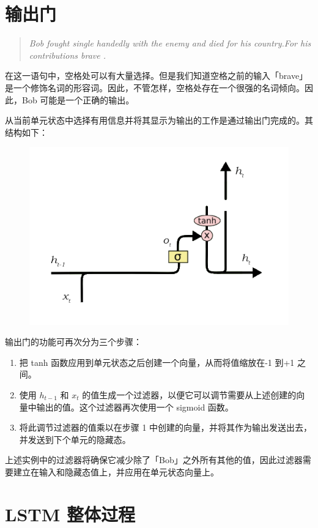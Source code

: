 \documentclass{article}
\begin{document}
\section{ 输出门}
\begin{quote}
	\emph{Bob fought single handedly with the enemy and died for his country.For his contributions brave .}
\end{quote}
在这一语句中，空格处可以有大量选择。但是我们知道空格之前的输入「brave」是一个修饰名词的形容词。因此，不管怎样，空格处存在一个很强的名词倾向。因此，Bob 可能是一个正确的输出。


从当前单元状态中选择有用信息并将其显示为输出的工作是通过输出门完成的。其结构如下：
\begin{figure}[H]
	\centering
	\includegraphics[scale=0.3]{5.png}
\end{figure}
输出门的功能可再次分为三个步骤：

\begin{enumerate}
\item 把 tanh 函数应用到单元状态之后创建一个向量，从而将值缩放在-1 到+1 之间。
\item 使用 $h_{t-1}$ 和 $x_t$ 的值生成一个过滤器，以便它可以调节需要从上述创建的向量中输出的值。这个过滤器再次使用一个 sigmoid 函数。
\item 将此调节过滤器的值乘以在步骤 1 中创建的向量，并将其作为输出发送出去，并发送到下个单元的隐藏态。
\end{enumerate}

上述实例中的过滤器将确保它减少除了「Bob」之外所有其他的值，因此过滤器需要建立在输入和隐藏态值上，并应用在单元状态向量上。
\section{LSTM 整体过程}
\end{document}
